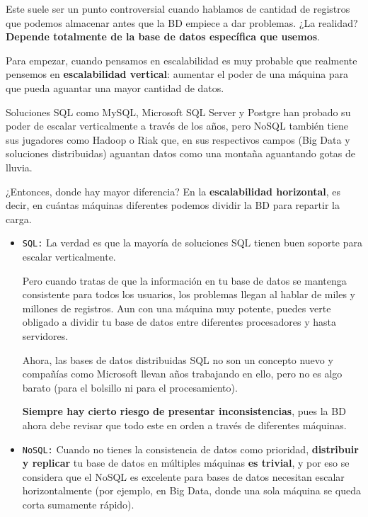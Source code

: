 Este suele ser un punto controversial cuando hablamos de cantidad de registros que podemos almacenar antes que la BD empiece a dar problemas. ¿La realidad? \textbf{Depende totalmente de la base de datos específica que usemos}.

Para empezar, cuando pensamos en escalabilidad es muy probable que realmente pensemos en \textbf{escalabilidad vertical}: aumentar el poder de una máquina para que pueda aguantar una mayor cantidad de datos.

Soluciones SQL como MySQL, Microsoft SQL Server y Postgre han probado su poder de escalar verticalmente a través de los años, pero NoSQL también tiene sus jugadores como Hadoop o Riak que, en sus respectivos campos (Big Data y soluciones distribuidas) aguantan datos como una montaña aguantando gotas de lluvia.

¿Entonces, donde hay mayor diferencia? En la \textbf{escalabilidad horizontal}, es decir, en cuántas máquinas diferentes podemos dividir la BD para repartir la carga.

\begin{itemize}

	\item \texttt{SQL:} La verdad es que la mayoría de soluciones SQL tienen buen soporte para escalar verticalmente.
	
	Pero cuando tratas de que la información en tu base de datos se mantenga consistente para todos los usuarios, los problemas llegan al hablar de miles y millones de registros. Aun con una máquina muy potente, puedes verte obligado a dividir tu base de datos entre diferentes procesadores y hasta servidores.
	
	Ahora, las bases de datos distribuidas SQL no son un concepto nuevo y compañías como Microsoft llevan años trabajando en ello, pero no es algo barato (para el bolsillo ni para el procesamiento).
	
	\textbf{Siempre hay cierto riesgo de presentar inconsistencias}, pues la BD ahora debe revisar que todo este en orden a través de diferentes máquinas.

	\item \texttt{NoSQL:} Cuando no tienes la consistencia de datos como prioridad, \textbf{distribuir y replicar} tu base de datos en múltiples máquinas \textbf{es trivial}, y por eso se considera que el NoSQL es excelente para bases de datos necesitan escalar horizontalmente (por ejemplo, en Big Data, donde una sola máquina se queda corta sumamente rápido).

\end{itemize}


